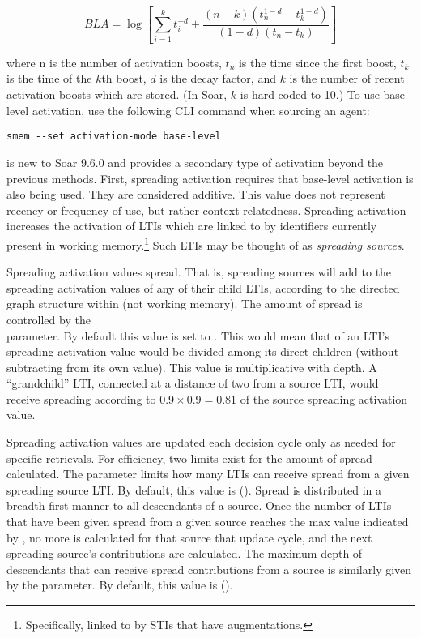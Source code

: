 $$BLA = \log \left[ \sum\limits_{i=1}^{k} t_i^{-d} + \dfrac{(n-k)(t_n^{1-d} - t_k^{1-d})}{(1-d)(t_n-t_k)} \right]$$

where n is the number of activation boosts, $t_n$ is the time since the first boost, $t_k$ is the time of the $k$th boost, $d$ is the decay factor, and $k$ is the number of recent activation boosts which are stored. (In Soar, $k$ is hard-coded to 10.) To use base-level activation, use the following CLI command when sourcing an agent:

\begin{verbatim}
smem --set activation-mode base-level
\end{verbatim}

 is new to Soar 9.6.0 and provides a secondary type of activation beyond the previous methods. First, spreading activation requires that base-level activation is also being used. They are considered additive. This value does not represent recency or frequency of use, but rather context-relatedness. Spreading activation increases the activation of LTIs which are linked to by identifiers currently present in working memory.\footnote{
	Specifically, linked to by STIs that have augmentations.} 
Such LTIs may be thought of as \textit{spreading sources}.

Spreading activation values spread. That is, spreading sources will add to the spreading activation values of any of their child LTIs, according to the directed graph structure within  (not working memory).
The amount of spread is controlled by the \\
 parameter. By default this value is set to . This would mean that  of an LTI's spreading activation value would be divided among its direct children (without subtracting from its own value). This value is multiplicative with depth. A ``grandchild'' LTI, connected at a distance of two from a source LTI, would receive spreading according to $0.9\times 0.9 = 0.81$ of the source spreading activation value.

Spreading activation values are updated each decision cycle only as needed for specific  retrievals. For efficiency, two limits exist for the amount of spread calculated. The  parameter limits how many LTIs can receive spread from a given spreading source LTI. By default, this value is (). Spread is distributed in a breadth-first manner to all descendants of a source. Once the number of LTIs that have been given spread from a given source reaches the max value indicated by , no more is calculated for that source that update cycle, and the next spreading source's contributions are calculated. The maximum depth of descendants that can receive spread contributions from a source is similarly given by the  parameter. By default, this value is ().

